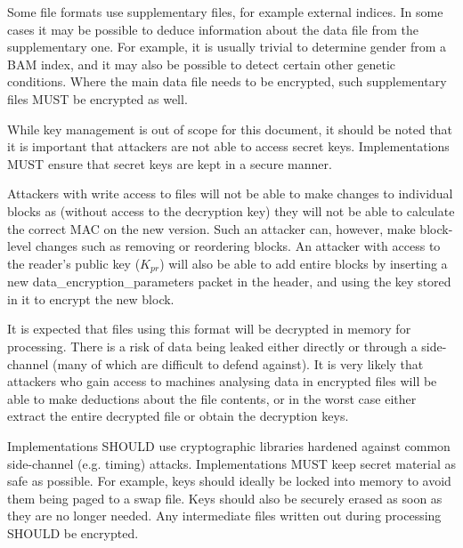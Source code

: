 \documentclass[10pt]{article}
\begin{document}
Some file formats use supplementary files, for example external indices.
In some cases it may be possible to deduce information about the data file from the supplementary one.
For example, it is usually trivial to determine gender from a BAM index,
and it may also be possible to detect certain other genetic conditions.
Where the main data file needs to be encrypted, such supplementary files MUST be encrypted as well.

While key management is out of scope for this document,
it should be noted that it is important that attackers are not able to access secret keys.
Implementations MUST ensure that secret keys are kept in a secure manner.

Attackers with write access to files will not be able to make changes to individual blocks as
(without access to the decryption key) they will not be able to calculate the correct MAC on the new version.
Such an attacker can, however, make block-level changes such as removing or reordering blocks.
An attacker with access to the reader's public key ($K_{pr}$) will also be able to add entire blocks by inserting a new
data\_encryption\_parameters packet in the header, and using the key stored in it to encrypt the new block.

It is expected that files using this format will be decrypted in memory for processing.
There is a risk of data being leaked either directly or through a side-channel (many of which are difficult to defend
against).
It is very likely that attackers who gain access to machines analysing data in encrypted files will be able
to make deductions about the file contents, or in the worst case either extract the entire decrypted file or
obtain the decryption keys.

Implementations SHOULD use cryptographic libraries hardened against common side-channel (e.g. timing) attacks.
Implementations MUST keep secret material as safe as possible.
For example, keys should ideally be locked into memory to avoid them being paged to a swap file.
Keys should also be securely erased as soon as they are no longer needed.
Any intermediate files written out during processing SHOULD be encrypted.
\end{document}
